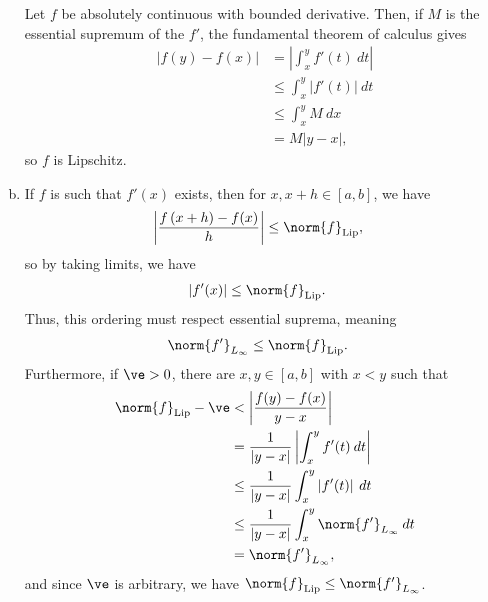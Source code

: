 \documentclass[10pt]{mypackage}
\begin{document}
\begin{enumerate}[(a)]
    Let $f$ be absolutely continuous with bounded derivative. Then, if $M$ is the essential supremum of the $f'$, the fundamental theorem of calculus gives
    \begin{align*}
      \left\vert f(y)-f(x) \right\vert &= \left\vert \int_{x}^{y} f'(t)\:dt \right\vert\\
                                       &\leq \int_{x}^{y} \left\vert f'(t) \right\vert\:dt\\
                                       &\leq \int_{x}^{y} M\:dx\\
                                       &= M\left\vert y-x \right\vert,
    \end{align*}
    so $f$ is Lipschitz.
  \item If $f$ is such that $f'(x)$ exists, then for $x,x+h\in [a,b]$, we have
    \begin{align*}
      \left\vert \frac{f\left( x+h \right)-f(x)}{h} \right\vert &\leq \norm{f}_{\text{Lip}},
    \end{align*}
    so by taking limits, we have
    \begin{align*}
      \left\vert f'(x) \right\vert &\leq \norm{f}_{\text{Lip}}.
    \end{align*}
    Thus, this ordering must respect essential suprema, meaning
    \begin{align*}
      \norm{f'}_{L_{\infty}} &\leq \norm{f}_{\text{Lip}}.
    \end{align*}
    Furthermore, if $\ve > 0$, there are $x,y\in [a,b]$ with $x < y$  such that
    \begin{align*}
      \norm{f}_{\text{Lip}} - \ve &< \left\vert \frac{f(y)-f(x)}{y-x} \right\vert\\
                                  &= \frac{1}{\left\vert y-x \right\vert} \left\vert \int_{x}^{y} f'(t)\:dt \right\vert\\
                                  &\leq \frac{1}{\left\vert y-x \right\vert} \int_{x}^{y} \left\vert f'(t) \right\vert\:dt\\
                                  &\leq \frac{1}{\left\vert y-x \right\vert} \int_{x}^{y} \norm{f'}_{L_{\infty}}\:dt\\
                                  &= \norm{f'}_{L_{\infty}},
    \end{align*}
    and since $\ve$ is arbitrary, we have $\norm{f}_{\text{Lip}}\leq \norm{f'}_{L_{\infty}}$.
\end{enumerate}
\end{document}
